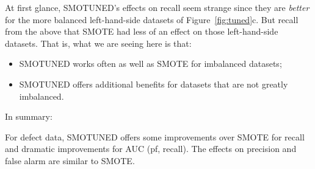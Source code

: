 \documentclass[10pt,conference]{IEEEtran}
\newcommand{\bi}{\begin{itemize}[leftmargin=0.4cm]}
\newcommand{\ei}{\end{itemize}}
\theoremstyle{break}
\theoremstyle{break}
\begin{document}
At first glance, SMOTUNED's effects on recall seem strange since they are
{\em better} for the more balanced left-hand-side datasets of
Figure~\ref{fig:tuned}c.  But recall from the above that SMOTE had less
of an effect on those left-hand-side datasets. That is, what we are seeing
here is that:
\bi
\item
SMOTUNED works often as well as SMOTE for imbalanced datasets;
\item
SMOTUNED offers additional benefits for datasets that are not greatly
imbalanced.
\ei





In summary:

\begin{lesson1}
    For defect data, SMOTUNED  
 offers   some  improvements over SMOTE for recall
 and dramatic improvements for AUC (pf, recall).
 The effects on precision and false alarm are similar to SMOTE.
\end{lesson1}
\end{document}
